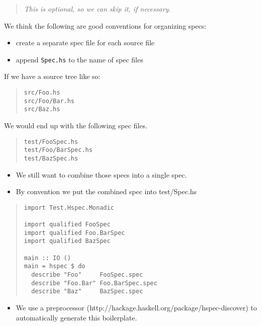 \documentclass[preprint]{sigplanconf}
\begin{document}
\begin{quote}
\emph{This is optional, so we can skip it, if necessary.}
\end{quote}

\noindent We think the following are good conventions for organizing specs:
\begin{itemize}
    \item create a separate spec file for each source file
    \item append {\tt Spec.hs} to the name of spec files
\end{itemize}

\noindent If we have a source tree like so:

\begin{quote}
\small
\begin{verbatim}
src/Foo.hs
src/Foo/Bar.hs
src/Baz.hs
\end{verbatim}
\end{quote}

\noindent We would end up with the following spec files.

\begin{quote}
\small
\begin{verbatim}
test/FooSpec.hs
test/Foo/BarSpec.hs
test/BazSpec.hs
\end{verbatim}
\end{quote}

\begin{itemize}
\item We still want to combine those specs into a single spec.
\item By convention we put the combined spec into test/Spec.hs
\end{itemize}

\begin{quote}
\small
\begin{verbatim}
import Test.Hspec.Monadic

import qualified FooSpec
import qualified Foo.BarSpec
import qualified BazSpec

main :: IO ()
main = hspec $ do
  describe "Foo"     FooSpec.spec
  describe "Foo.Bar" Foo.BarSpec.spec
  describe "Baz"     BazSpec.spec
\end{verbatim}
\end{quote}

\begin{itemize}
\item We use a preprocessor (http://hackage.haskell.org/package/hspec-discover) to automatically generate this boilerplate.
\end{itemize}
\end{document}
